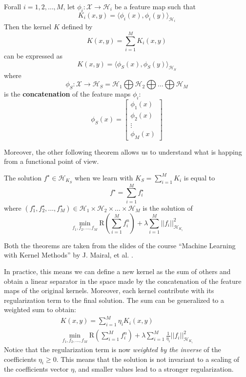 \begin{theorem}
Forall $i = 1, 2, \dots, M$, let $\phi_i : \mathcal{X} \rightarrow \mathcal{H}_i$ be a feature map such that 
$$
    K_i (x, y) = \langle \phi_i(x), \phi_i(y) \rangle_{\mathcal{H}_i}
$$
Then the kernel $K$ defined by
$$
    K(x, y) = \sum_{i=1}^M K_i(x, y)
$$
can be expressed as
$$
    K(x, y) = \langle \phi_S(x), \phi_S(y) \rangle_{\mathcal{H}_S}
$$
where 
$$
\phi_S : \mathcal{X} \rightarrow \mathcal{H}_S = \mathcal{H}_1 \bigoplus \mathcal{H}_2 \bigoplus \dots \bigoplus \mathcal{H}_M
$$
is the \textbf{concatenation} of the feature maps $\phi_i$:
$$
    \phi_S(x) = \left[ \begin{array}{c} \phi_1(x) \\ \phi_2(x) \\ \vdots \\ \phi_M(x) \end{array} \right]
$$
\end{theorem}

Moreover, the other following theorem allows us to understand what is
happing from a functional point of view.

\begin{theorem}
The solution $f^{\star} \in \mathcal{H}_{K_S}$ when we learn with 
$K_S = \sum_{i=1}^{M} K_i$ is equal to
$$
    f^{\star} = \sum_{i=1}^{M} f^{\star}_i
$$
where $(f^{\star}_1, f^{\star}_2, \dots, f^{\star}_M) \in \mathcal{H}_1 \times \mathcal{H}_2 \times \dots \times \mathcal{H}_M$
is the solution of
$$
    \min_{f_1, f_2, \dots, f_M} \text{R}(\sum_{i=1}^{M} f_i^n) + \lambda \sum_{i=1}^{M} || f_i ||_{\mathcal{H}_{K_i}}^2
$$
\end{theorem}
Both the theorems are taken from the slides of the course
\enquote{Machine Learning with Kernel Methods} by J. Mairal, et al.
\cite{mairal2022kernelmethods}.


In practice, this means we can define a new kernel as the sum of others
and obtain a linear separator in the space made by the concatenation of
the feature maps of the original kernels. Moreover, each kernel contribute
with its regularization term to the final solution. The sum can be generalized
to a weighted sum to obtain:
\begin{align*}
    K(x, y) = \sum_{i=1}^{M} \eta_i K_i(x, y) \\
    \min_{f_1, f_2, \dots, f_M} \text{R}(\sum_{i=1}^{M} f_i^n) + \lambda \sum_{i=1}^{M} \frac{1}{\eta_i} || f_i ||_{\mathcal{H}_{K_i}}^2
\end{align*}
Notice that the regularization term is now \textit{weighted by the inverse} of the
coefficients $\eta_i \ge 0$. This means that the solution is not invariant to a scaling
of the coefficients vector $\eta$, and smaller values lead to a stronger regularization.

